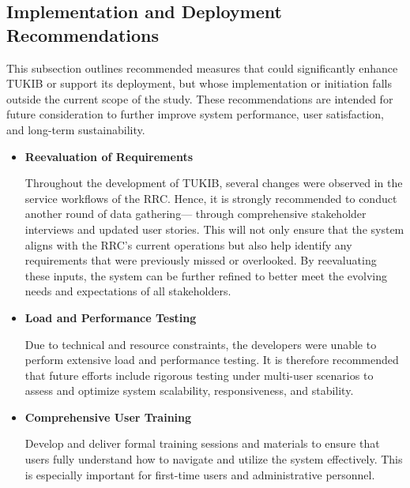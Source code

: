 \subsection{Implementation and Deployment Recommendations}

This subsection outlines recommended measures that could significantly enhance TUKIB or support its deployment, but whose implementation or initiation falls outside the current scope of the study. These recommendations are intended for future consideration to further improve system performance, user satisfaction, and long-term sustainability.

\begin{itemize}
	
	\item \textbf {Reevaluation of Requirements}
	
	Throughout the development of TUKIB, several changes were observed in the service workflows of the RRC. Hence, it is strongly recommended to conduct another round of data gathering— through comprehensive stakeholder interviews and updated user stories. This will not only ensure that the system aligns with the RRC’s current operations but also help identify any requirements that were previously missed or overlooked. By reevaluating these inputs, the system can be further refined to better meet the evolving needs and expectations of all stakeholders.
	
	\item \textbf{Load and Performance Testing}
	
	Due to technical and resource constraints, the developers were unable to perform extensive load and performance testing. It is therefore recommended that future efforts include rigorous testing under multi-user scenarios to assess and optimize system scalability, responsiveness, and stability.
	
	\item \textbf{Comprehensive User Training}
	
	Develop and deliver formal training sessions and materials to ensure that users fully understand how to navigate and utilize the system effectively. This is especially important for first-time users and administrative personnel.
	
\end{itemize}